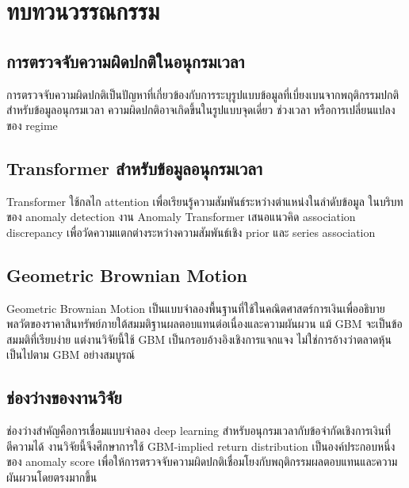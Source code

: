 \chapter{ทบทวนวรรณกรรม}

\section{การตรวจจับความผิดปกติในอนุกรมเวลา}

การตรวจจับความผิดปกติเป็นปัญหาที่เกี่ยวข้องกับการระบุรูปแบบข้อมูลที่เบี่ยงเบนจากพฤติกรรมปกติ \citep{chandola2009anomaly,pang2021deep} สำหรับข้อมูลอนุกรมเวลา ความผิดปกติอาจเกิดขึ้นในรูปแบบจุดเดี่ยว ช่วงเวลา หรือการเปลี่ยนแปลงของ regime

\section{Transformer สำหรับข้อมูลอนุกรมเวลา}

Transformer ใช้กลไก attention เพื่อเรียนรู้ความสัมพันธ์ระหว่างตำแหน่งในลำดับข้อมูล \citep{vaswani2017attention} ในบริบทของ anomaly detection งาน Anomaly Transformer เสนอแนวคิด association discrepancy เพื่อวัดความแตกต่างระหว่างความสัมพันธ์เชิง prior และ series association \citep{xu2022anomaly}

\section{Geometric Brownian Motion}

Geometric Brownian Motion เป็นแบบจำลองพื้นฐานที่ใช้ในคณิตศาสตร์การเงินเพื่ออธิบายพลวัตของราคาสินทรัพย์ภายใต้สมมติฐานผลตอบแทนต่อเนื่องและความผันผวน \citep{merton1973theory,hull2018options} แม้ GBM จะเป็นข้อสมมติที่เรียบง่าย แต่งานวิจัยนี้ใช้ GBM เป็นกรอบอ้างอิงเชิงการแจกแจง ไม่ใช่การอ้างว่าตลาดหุ้นเป็นไปตาม GBM อย่างสมบูรณ์

\section{ช่องว่างของงานวิจัย}

ช่องว่างสำคัญคือการเชื่อมแบบจำลอง deep learning สำหรับอนุกรมเวลากับข้อจำกัดเชิงการเงินที่ตีความได้ งานวิจัยนี้จึงศึกษาการใช้ GBM-implied return distribution เป็นองค์ประกอบหนึ่งของ anomaly score เพื่อให้การตรวจจับความผิดปกติเชื่อมโยงกับพฤติกรรมผลตอบแทนและความผันผวนโดยตรงมากขึ้น

